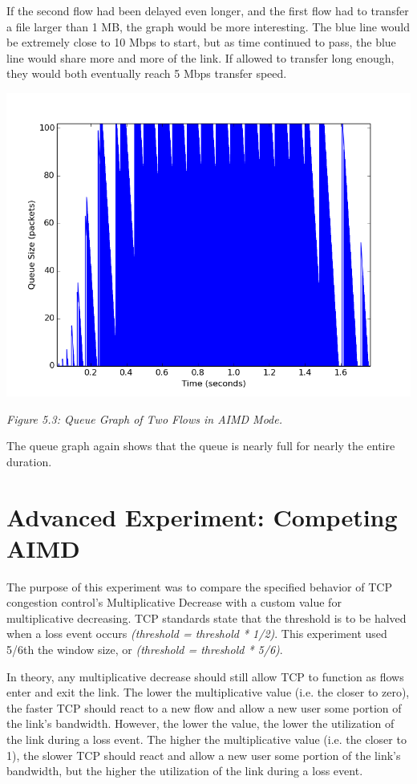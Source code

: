 \documentclass[11pt]{article}
\begin{document}
If the second flow had been delayed even longer, and the first flow had to transfer a file larger than 1 MB, the graph would be more interesting. The blue line would be extremely close to 10 Mbps to start, but as time continued to pass, the blue line would share more and more of the link. If allowed to transfer long enough, they would both eventually reach 5 Mbps transfer speed.


\includegraphics[width=17cm]{outputs/AIMD/AIMD_queue.png}

\centerline{\emph{Figure 5.3: Queue Graph of Two Flows in AIMD Mode.}}

The queue graph again shows that the queue is nearly full for nearly the entire duration.




\section{Advanced Experiment: Competing AIMD}

The purpose of this experiment was to compare the specified behavior of TCP congestion control's Multiplicative Decrease with a custom value for multiplicative decreasing. TCP standards state that the threshold is to be halved when a loss event occurs \emph{(threshold = threshold * 1/2)}. This experiment used 5/6th the window size, or \emph{(threshold = threshold * 5/6)}.

In theory, any multiplicative decrease should still allow TCP to function as flows enter and exit the link. The lower the multiplicative value (i.e. the closer to zero), the faster TCP should react to a new flow and allow a new user some portion of the link's bandwidth. However, the lower the value, the lower the utilization of the link during a loss event. The higher the multiplicative value (i.e. the closer to 1), the slower TCP should react and allow a new user some portion of the link's bandwidth, but the higher the utilization of the link during a loss event.
\end{document}
